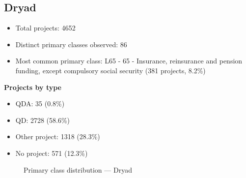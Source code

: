 \subsection{Dryad}

\begin{itemize}
    \item Total projects: 4652
    \item Distinct primary classes observed: 86
    \item Most common primary class: L65 - 65 - Insurance, reinsurance and pension funding, except compulsory social security (381 projects, 8.2\%)
\end{itemize}
\textbf{Projects by type}
\begin{itemize}
    \item QDA: 35 (0.8\%)
    \item QD: 2728 (58.6\%)
    \item Other project: 1318 (28.3\%)
    \item No project: 571 (12.3\%)
\end{itemize}

\begin{figure}[h]
    \centering
    
    \caption{Primary class distribution --- Dryad}
\end{figure}

